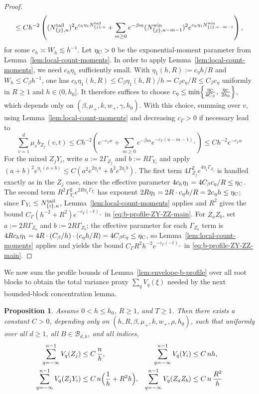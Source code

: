 \documentclass{article}
\newtheorem{proposition}{Proposition}[section]
\begin{document}
\begin{proof}
\[\le C h^{-2}\left((N_{\{j\},u}^{\rm tail})^2 e^{c_h\eta_1 N_{\{j\},u}^{\rm tail}} + \sum_{m\ge 0} e^{-\beta m}(N_{\{j\},u-m-1}^{\rm win})^2 e^{c_h\eta_1 N_{\{j\},u-m-1}^{\rm win}}\right),
\]
for some $c_h\asymp W_h\lesssim h^{-1}$. Let $\eta_{\rm C}>0$ be the exponential-moment parameter from Lemma~\ref{lem:local-count-moments}. In order to apply Lemma~\ref{lem:local-count-moments}, we need $c_h\eta_1$ sufficiently small. With $\eta_1(h,R):=c_\eta h/R$ and $W_h\le C_\beta h^{-1}$, one has $c_h\eta_1(h,R)\le C_\beta\eta_1(h,R)/h = C_\beta c_\eta/R\le C_\beta c_\eta$ uniformly in $R\ge 1$ and $h\in(0,h_0]$. It therefore suffices to choose
$c_\eta\le \min\!\left\{\frac{\eta_{\rm C}}{4C_\beta},\,\frac{\eta_{\rm C}}{2h_0}\right\}$, which depends only on $(\beta,\mu_+,k,w_+,\gamma,h_0)$. With this choice, summing over $v$, using Lemma~\ref{lem:local-count-moments} and decreasing $c_\Gamma>0$ if necessary lead to
\[
\sum_{v=1}^d \mu_v b_{Z_j}(v,t)
\le C h^{-2}\left(e^{-c_\Gamma u}+\sum_{m\ge 0} e^{-\beta m} e^{-c_\Gamma (u-m-1)_+}\right)
\le C h^{-2} e^{-c_\Gamma u}
\]
For the mixed $Z_jY_i$, write $a:=2\Gamma_{Z_j}$ and $b:=R\Gamma_{Y_i}$ and apply $(a+b)^2e^{\eta_1(a+b)}\le C(a^2e^{2\eta_1 a}+b^2e^{2\eta_1 b})$. The first term $4\Gamma_{Z_j}^2e^{4\eta_1\Gamma_{Z_j}}$ is handled exactly as in the $Z_j$ case, since the effective parameter $4c_h\eta_1 = 4C_\beta c_\eta/R\le \eta_{\rm C}$. The second term $R^2\Gamma_{Y_i}^2e^{2R\eta_1\Gamma_{Y_i}}$  has exponent $2R\eta_1 = 2R\cdot c_\eta h/R = 2c_\eta h\le \eta_{\rm C}$; since $\Gamma_{Y_i}\le N_{\{i\},u}^{\rm tail}$, Lemma~\ref{lem:local-count-moments} applies and $R^2$ gives the bound $C_\Gamma(h^{-2}+R^2)e^{-c_\Gamma(-t)_+}$ in \eqref{eq:b-profile-ZY-ZZ-main}. For $Z_aZ_b$, set $a:=2R\Gamma_{Z_a}$ and $b:=2R\Gamma_{Z_b}$; the effective parameter for each $\Gamma_{Z_a}$ term is $4Rc_h\eta_1 = 4R\cdot(C_\beta/h)\cdot(c_\eta h/R) = 4C_\beta c_\eta\le\eta_{\rm C}$, so Lemma~\ref{lem:local-count-moments} applies and yields the bound $C_\Gamma R^2h^{-2}e^{-c_\Gamma(-t)_+}$ in \eqref{eq:b-profile-ZY-ZZ-main}.
\end{proof}
We now sum the profile bounds of Lemma~\ref{lem:envelope-b-profile} over all root blocks to obtain the total variance proxy $\sum_q V_q(\xi)$ needed by the next bounded-block concentration lemma.
\begin{proposition}
\label{prop:square-profile}
Assume $0<h\le h_0$, $R\ge 1$, and $T\ge 1$. Then there exists a constant $C>0$, depending only on $(h,R,\beta,\mu_+,k,w_+,\rho,h_0)$, such that uniformly over all $d\ge 1$, all $B\in\mathcal B_{d,k}$, and all indices,
\begin{align}
\sum_{q=-\infty}^{n-1}V_q(Z_j) &\le C\,\frac{n}{h}, &\sum_{q=-\infty}^{n-1}V_q(Y_i) &\le C\,n h,\label{eq:square-profile-Z-Y-main}\\
\sum_{q=-\infty}^{n-1}V_q(Z_jY_i) &\le C\,n\Bigl(\frac1h+R^2 h\Bigr), &\sum_{q=-\infty}^{n-1}V_q(Z_aZ_b) &\le C\,n\,\frac{R^2}{h}\label{eq:square-profile-ZY-ZZ-main}
\end{align}
\end{proposition}
\end{document}
